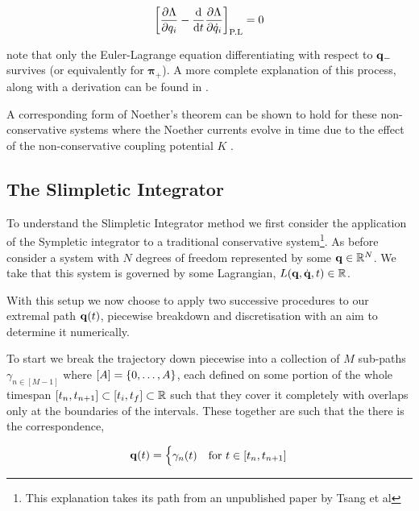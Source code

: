 \documentclass[10pt]{iopart}
\def\SI{Slimpletic Integrator}
\def\SymI{{Sympletic integrator}}
\def\vbq{\vb{q}}
\begin{document}
\begin{equation}
  	\left[\frac{\partial \Lambda}{\partial q_i} - \frac{\dd}{\dd t}\frac{\partial \Lambda}{\partial \dot q_i}\right]_{\text{P.L}} = 0
\end{equation}

note that only the Euler-Lagrange equation differentiating with respect to $\vbq_-$ survives (or equivalently for $\boldsymbol{\pi}_+$). A more complete explanation of this process, along with a derivation can be found in \cite{galleyClassicalMechanicsNonconservative2013}.

A corresponding form of Noether’s theorem can be shown to hold for these non-conservative systems where the Noether currents evolve in time due to the effect of the non-conservative coupling potential $K$ \cite{galleyPrincipleStationaryNonconservative2014}.

\subsection{The \SI}
\label{sec:intro-si}


To understand the \SI{} method we first consider the application of the \SymI{} to a traditional conservative system\footnote{This explanation takes its path from an unpublished paper by Tsang et al\cite{tsangVariationalSymplecticIntegrators}}. As before consider a system with $N$ degrees of freedom represented by some $\vbq \in \R^N$. We take that this system is governed by some Lagrangian, $L(\vbq, \dot{\vbq}, t) \in \R$.

With this setup we now choose to apply two successive procedures to our extremal path $\vb q(t)$, piecewise breakdown and discretisation with an aim to determine it numerically.

To start we break the trajectory down piecewise into a collection of $M$ sub-paths $\gamma_{n \in [M - 1]}$ where $[A] = \left\{0, \dots, A\right\}$, each defined on some portion of the whole timespan $[t_n, t_{n + 1}] \subset [t_i, t_f] \subset \mathbb{R}$ such that they cover it completely with overlaps only at the boundaries of the intervals. These together are such that the there is the correspondence,

\begin{equation}
\label{eq:pw-traj}
	\vb q(t) = \begin{cases}
		\gamma_n(t) &\text{for~} t \in [t_n, t_{n + 1}]
	\end{cases}
\end{equation}
\end{document}

